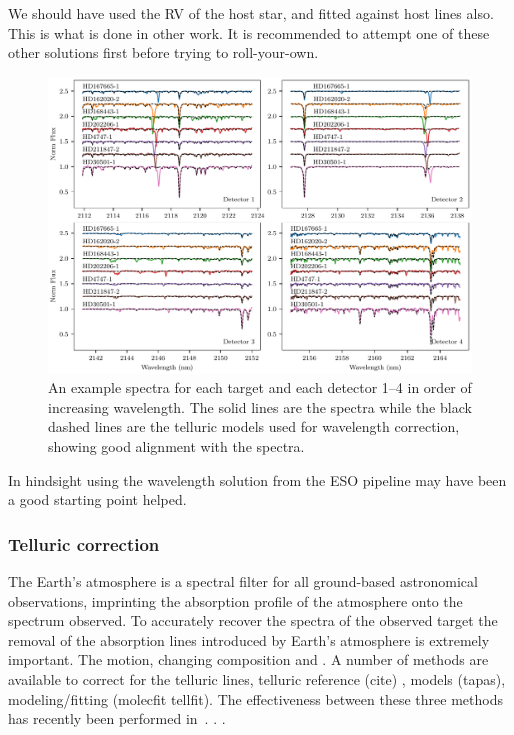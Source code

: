 We should have used the RV of the host star, and fitted against host lines also. This is what is done in other work. It is recommended to attempt one of these other solutions first before trying to roll-your-own.

\begin{figure}
    \centering
    \includegraphics[width=1\linewidth]{figures/reduction/Spectra_examples}
    \caption{An example spectra for each target and each detector 1--4 in order of increasing wavelength. The solid lines are the spectra while the black dashed lines are the telluric models used for wavelength correction, showing good alignment with the spectra.}
    \label{fig:spectraexamples}
\end{figure}







In hindsight using the wavelength solution from the ESO pipeline may have been a good starting point helped.

\subsubsection{Telluric correction}
\label{subsec:telluric_correction}
The Earth's atmosphere is a spectral filter for all ground-based astronomical observations, imprinting the absorption profile of the atmosphere onto the spectrum observed. To accurately recover the spectra of the observed target the removal of the absorption lines introduced by Earth's atmosphere is extremely important. The motion, changing composition and .
A number of methods are available to correct for the telluric lines, telluric reference (cite) , models (tapas), modeling/fitting (molecfit tellfit). The effectiveness between these three methods has recently been performed in~\cite{ulmer-moll_telluric_2018}.   . .

